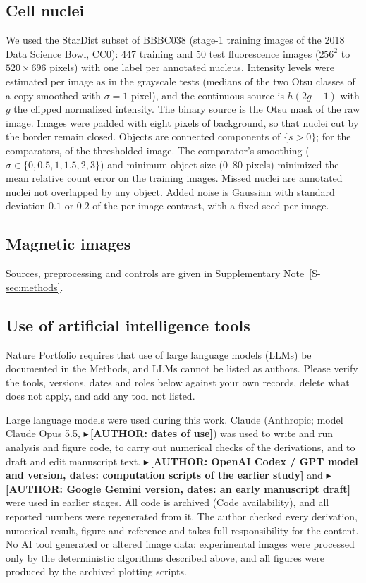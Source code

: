 \documentclass[11pt,a4paper]{article}
\newcommand{\fillin}[1]{\textcolor{todo}{\bfseries $\blacktriangleright$\,[AUTHOR: #1]}}
\begin{document}
\subsection*{Cell nuclei}
We used the StarDist subset\cite{Schmidt2018} of BBBC038 (stage-1 training images of the 2018 Data Science Bowl, CC0\cite{Caicedo2019}): 447 training and 50 test fluorescence images ($256^2$ to $520\times696$ pixels) with one label per annotated nucleus. Intensity levels were estimated per image as in the grayscale tests (medians of the two Otsu classes of a copy smoothed with $\sigma=1$ pixel), and the continuous source is $h(2g-1)$ with $g$ the clipped normalized intensity. The binary source is the Otsu mask of the raw image. Images were padded with eight pixels of background, so that nuclei cut by the border remain closed. Objects are connected components of $\{s>0\}$; for the comparators, of the thresholded image. The comparator's smoothing ($\sigma\in\{0,0.5,1,1.5,2,3\}$) and minimum object size ($0$--$80$ pixels) minimized the mean relative count error on the training images. Missed nuclei are annotated nuclei not overlapped by any object. Added noise is Gaussian with standard deviation $0.1$ or $0.2$ of the per-image contrast, with a fixed seed per image.

\subsection*{Magnetic images}
Sources, preprocessing and controls are given in Supplementary Note~\ref{S-sec:methods}.

\subsection*{Use of artificial intelligence tools}
\begin{authorbox}
Nature Portfolio requires that use of large language models (LLMs) be documented in the Methods, and LLMs cannot be listed as authors. Please verify the tools, versions, dates and roles below against your own records, delete what does not apply, and add any tool not listed.
\end{authorbox}
Large language models were used during this work. Claude (Anthropic; model Claude Opus 5.5, \fillin{dates of use}) was used to write and run analysis and figure code, to carry out numerical checks of the derivations, and to draft and edit manuscript text. \fillin{OpenAI Codex / GPT model and version, dates: computation scripts of the earlier study} and \fillin{Google Gemini version, dates: an early manuscript draft} were used in earlier stages. All code is archived (Code availability), and all reported numbers were regenerated from it. The author checked every derivation, numerical result, figure and reference and takes full responsibility for the content. No AI tool generated or altered image data: experimental images were processed only by the deterministic algorithms described above, and all figures were produced by the archived plotting scripts.
\end{document}
